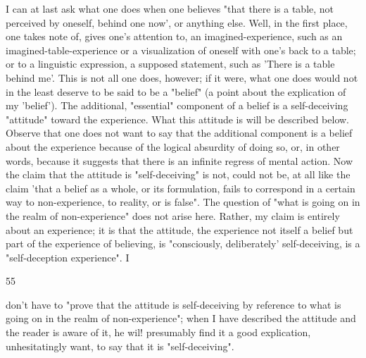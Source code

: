 \documentclass[10pt,twoside]{memoir}
\begin{document}
\begin{enumerate}
{{{{{{{{{{{{{{{I can at last ask what one does when one believes "that there is a table, 
not perceived by oneself, behind one now', or anything else. Well, in the 
first place, one takes note of, gives one's attention to, an 
imagined-experience, such as an imagined-table-experience or a visualization 
of oneself with one's back to a table; or to a linguistic expression, a supposed 
statement, such as 'There is a table behind me'. This is not all one does, 
however; if it were, what one does would not in the least deserve to be said 
to be a "belief" (a point about the explication of my 'belief'). The 
additional, "essential" component of a belief is a self-deceiving "attitude" 
toward the experience. What this attitude is will be described below. Observe 
that one does not want to say that the additional component is a belief 
about the experience because of the logical absurdity of doing so, or, in 
other words, because it suggests that there is an infinite regress of mental 
action. Now the claim that the attitude is "self-deceiving" is not, could not 
be, at all like the claim 'that a belief as a whole, or its formulation, fails to 
correspond in a certain way to non-experience, to reality, or is false". The 
question of "what is going on in the realm of non-experience" does not arise 
here. Rather, my claim is entirely about an experience; it is that the attitude, 
the experience not itself a belief but part of the experience of believing, is 
"consciously, deliberately' self-deceiving, is a "self-deception experience". I 


55 


don't have to "prove that the attitude is self-deceiving by reference to what 
is going on in the realm of non-experience"; when I have described the 
attitude and the reader is aware of it, he wil! presumably find it a good 
explication, unhesitatingly want, to say that it is "self-deceiving". 

}}}}}}}}}}}}}}}
\end{enumerate}
\end{document}
